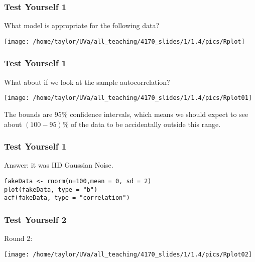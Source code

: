 \documentclass{beamer}
\begin{document}

\begin{frame}
\frametitle{Test Yourself 1}

What model is appropriate for the following data?

\begin{center}
\texttt{[image: /home/taylor/UVa/all\_teaching/4170\_slides/1/1.4/pics/Rplot]}
\end{center}

\end{frame}


\begin{frame}
\frametitle{Test Yourself 1}

What about if we look at the sample autocorrelation?

\begin{center}
\texttt{[image: /home/taylor/UVa/all\_teaching/4170\_slides/1/1.4/pics/Rplot01]}
\end{center}

The bounds are $95$\% confidence intervals, which means we should expect to see about $(100-95)$\% of the data to be accidentally outside this range.

\end{frame}


\begin{frame}[fragile]
\frametitle{Test Yourself 1}

Answer: it was IID Gaussian Noise.
\begin{verbatim}
fakeData <- rnorm(n=100,mean = 0, sd = 2)
plot(fakeData, type = "b")
acf(fakeData, type = "correlation")
\end{verbatim}

\end{frame}



\begin{frame}
\frametitle{Test Yourself 2}

Round 2: 

\begin{center}
\texttt{[image: /home/taylor/UVa/all\_teaching/4170\_slides/1/1.4/pics/Rplot02]}
\end{center}

\end{frame}
\end{document}
